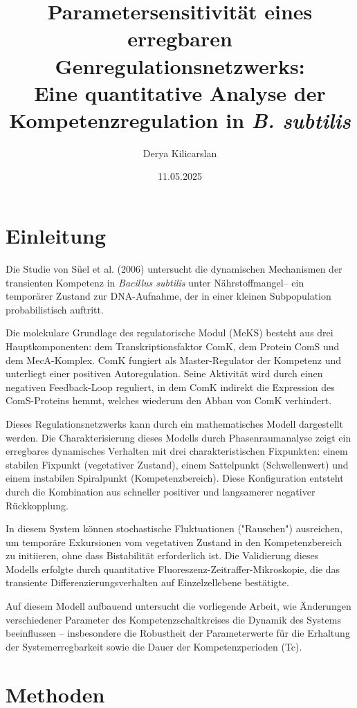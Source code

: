 \documentclass[11pt]{article}
\title{\Large \textbf{Parametersensitivität eines erregbaren Genregulationsnetzwerks:}\\
\Large Eine quantitative Analyse der Kompetenzregulation in \textit{B. subtilis}}
\author{Derya Kilicarslan}
\date{11.05.2025}
\begin{document}
\maketitle

\section{Einleitung}\label{section-introduction}

Die Studie von Süel et al. (2006) untersucht die dynamischen Mechanismen der transienten Kompetenz in \textit{Bacillus subtilis} unter Nährstoffmangel– ein temporärer Zustand zur DNA-Aufnahme, der in einer kleinen Subpopulation probabilistisch auftritt.

Die molekulare Grundlage des regulatorische Modul (MeKS) besteht aus drei Hauptkomponenten: dem Transkriptionsfaktor ComK, dem Protein ComS und dem MecA-Komplex. ComK fungiert als Master-Regulator der Kompetenz und unterliegt einer positiven Autoregulation. Seine Aktivität wird durch einen negativen Feedback-Loop reguliert, in dem ComK indirekt die Expression des ComS-Proteins hemmt, welches wiederum den Abbau von ComK verhindert.

Dieses Regulationsnetzwerks kann durch ein mathematisches Modell dargestellt werden. Die Charakterisierung dieses Modells durch Phasenraumanalyse zeigt ein erregbares dynamisches Verhalten mit drei charakteristischen Fixpunkten: einem stabilen Fixpunkt (vegetativer Zustand), einem Sattelpunkt (Schwellenwert) und einem instabilen Spiralpunkt (Kompetenzbereich). Diese Konfiguration entsteht durch die Kombination aus schneller positiver und langsamerer negativer Rückkopplung.

In diesem System können stochastische Fluktuationen ("Rauschen") ausreichen, um temporäre Exkursionen vom vegetativen Zustand in den Kompetenzbereich zu initiieren, ohne dass Bistabilität erforderlich ist. Die Validierung dieses Modells erfolgte durch quantitative Fluoreszenz-Zeitraffer-Mikroskopie, die das transiente Differenzierungsverhalten auf Einzelzellebene bestätigte.

Auf diesem Modell aufbauend untersucht die vorliegende Arbeit, wie Änderungen verschiedener Parameter des Kompetenzschaltkreises die Dynamik des Systems beeinflussen – insbesondere die Robustheit der Parameterwerte für die Erhaltung der Systemerregbarkeit sowie die Dauer der Kompetenzperioden (Tc).

\section{Methoden}\label{section-methods}
\end{document}
